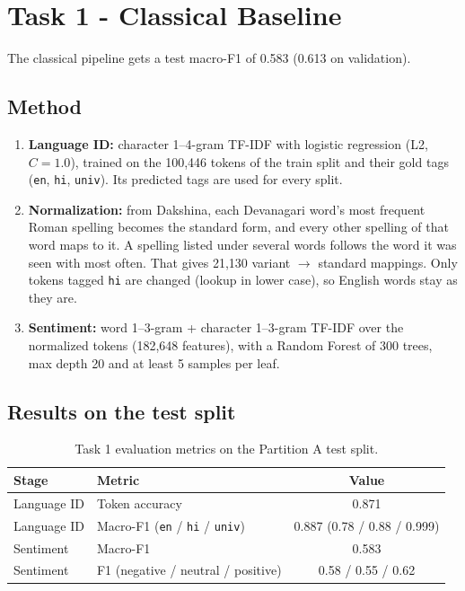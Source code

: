 \section{Task 1 - Classical Baseline}

The classical pipeline gets a test macro-F1 of 0.583 (0.613 on validation).

\subsection*{Method}
\begin{enumerate}
    \item \textbf{Language ID:} character 1--4-gram TF-IDF with logistic regression (L2, $C=1.0$), trained on the 100,446 tokens of the train split and their gold tags (\texttt{en}, \texttt{hi}, \texttt{univ}). Its predicted tags are used for every split.
    \item \textbf{Normalization:} from Dakshina, each Devanagari word's most frequent Roman spelling becomes the standard form, and every other spelling of that word maps to it. A spelling listed under several words follows the word it was seen with most often. That gives 21,130 variant $\rightarrow$ standard mappings. Only tokens tagged \texttt{hi} are changed (lookup in lower case), so English words stay as they are.
    \item \textbf{Sentiment:} word 1--3-gram + character 1--3-gram TF-IDF over the normalized tokens (182,648 features), with a Random Forest of 300 trees, max depth 20 and at least 5 samples per leaf.
\end{enumerate}

\subsection*{Results on the test split}
\begin{table}[H]
    \centering
    \begin{tabular}{@{}llc@{}}
        \toprule
        \textbf{Stage} & \textbf{Metric} & \textbf{Value} \\
        \midrule
        Language ID & Token accuracy & 0.871 \\
        Language ID & Macro-F1 (\texttt{en} / \texttt{hi} / \texttt{univ}) & 0.887 (0.78 / 0.88 / 0.999) \\
        Sentiment & Macro-F1 & 0.583 \\
        Sentiment & F1 (negative / neutral / positive) & 0.58 / 0.55 / 0.62 \\
        \bottomrule
    \end{tabular}
    \caption{Task 1 evaluation metrics on the Partition A test split.}
    \label{tab:task1_results}
\end{table}

